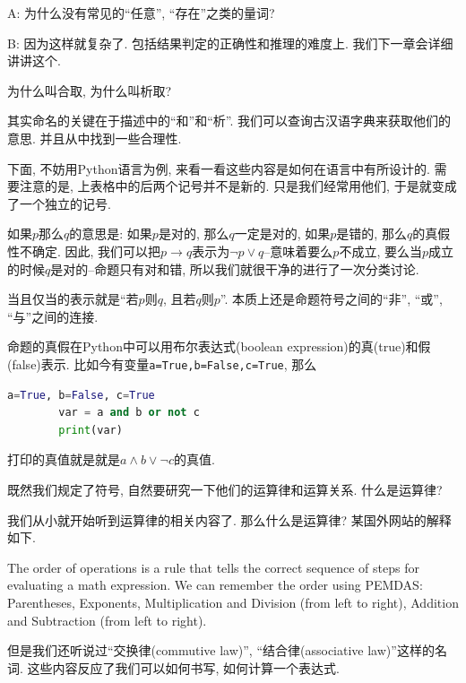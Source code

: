 \begin{dialogue}
	A: 为什么没有常见的``任意'', ``存在''之类的量词?
	
	B: 因为这样就复杂了. 包括结果判定的正确性和推理的难度上. 我们下一章会详细讲讲这个. 
\end{dialogue}

\begin{bonus}
	为什么叫合取, 为什么叫析取? 
\end{bonus}

其实命名的关键在于描述中的``和''和``析''. 我们可以查询古汉语字典来获取他们的意思. 并且从中找到一些合理性. 

下面, 不妨用Python语言为例, 来看一看这些内容是如何在语言中有所设计的. 需要注意的是, 上表格中的后两个记号并不是新的. 只是我们经常用他们, 于是就变成了一个独立的记号. 

如果$p$那么$q$的意思是: 如果$p$是对的, 那么$q$一定是对的, 如果$p$是错的, 那么$q$的真假性不确定. 因此, 我们可以把$p\rightarrow q$表示为$\lnot p \lor q$--意味着要么$p$不成立, 要么当$p$成立的时候$q$是对的--命题只有对和错, 所以我们就很干净的进行了一次分类讨论. 

当且仅当的表示就是``若$p$则$q$, 且若$q$则$p$''. 本质上还是命题符号之间的``非'', ``或'', ``与''之间的连接. 

\begin{example}
	命题的真假在Python中可以用布尔表达式(boolean expression)的真(true)和假(false)表示. 比如今有变量\texttt{a=True,b=False,c=True}, 那么
	\begin{lstlisting}[language=Python]
		a=True, b=False, c=True
		var = a and b or not c
		print(var)
	\end{lstlisting}
	打印的真值就是就是$a\land b\lor \lnot c$的真值. 
\end{example}

既然我们规定了符号, 自然要研究一下他们的运算律和运算关系. 什么是运算律? 

\begin{example}
	我们从小就开始听到运算律的相关内容了. 那么什么是运算律? 某国外网站的解释如下. 
	
	
		
The order of operations is a rule that tells the correct sequence of steps for evaluating a math expression. We can remember the order using PEMDAS: Parentheses, Exponents, Multiplication and Division (from left to right), Addition and Subtraction (from left to right).



	但是我们还听说过``交换律(commutive law)'', ``结合律(associative law)''这样的名词. 这些内容反应了我们可以如何书写, 如何计算一个表达式. 

	
\end{example}

